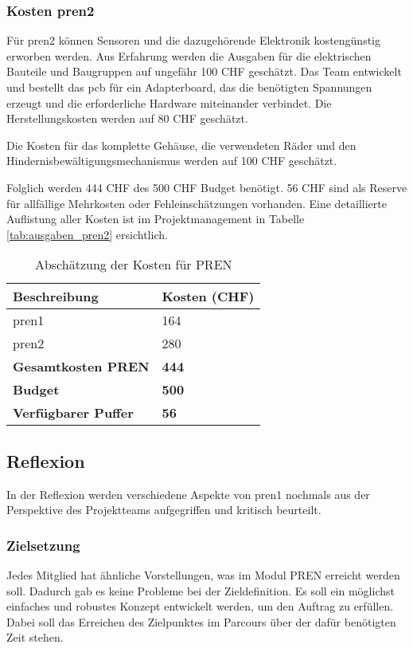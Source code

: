 \documentclass[../main.tex]{subfiles}
\begin{document}
\subsubsection{Kosten \acrshort{pren2}}
Für \acrshort{pren2} können
Sensoren und die dazugehörende Elektronik kostengünstig erworben werden. Aus Erfahrung werden die Ausgaben für die elektrischen Bauteile und Baugruppen auf ungefähr 100 CHF geschätzt. Das Team entwickelt und bestellt das \acrshort{pcb} für ein Adapterboard, das die benötigten Spannungen erzeugt und die erforderliche Hardware miteinander verbindet. Die Herstellungskosten werden auf 80 CHF geschätzt.

Die Kosten für das komplette Gehäuse, die verwendeten Räder und den Hindernisbewältigungsmechanismus werden auf 100 CHF geschätzt.

Folglich werden 444 CHF des 500 CHF Budget benötigt. 56 CHF sind als Reserve für allfällige Mehrkosten oder Fehleinschätzungen vorhanden. Eine detaillierte Auflistung aller Kosten ist im Projektmanagement in Tabelle \ref{tab:ausgaben_pren2} ersichtlich.

\begin{table}[h!]
    \centering
    \begin{tabular}{|p{5cm}|p{3cm}|}
        \hline
        \textbf{Beschreibung} & \textbf{Kosten (CHF)} \\
        \hline
        \acrshort{pren1} & 164 \\
        \hline
        \acrshort{pren2} & 280 \\
        \hline
        \textbf{Gesamtkosten PREN} & \textbf{444} \\
        \hline
        \textbf{Budget} & \textbf{500} \\
        \hline
        \textbf{Verfügbarer Puffer} & \textbf{56} \\
        \hline
    \end{tabular}
    \caption{Abschätzung der Kosten für PREN}
    \label{tab:kostenuebersicht}
\end{table}

\subsection{Reflexion}
In der Reflexion werden verschiedene Aspekte von \acrshort{pren1} nochmals aus der Perspektive des Projektteams aufgegriffen und kritisch beurteilt.

\subsubsection{Zielsetzung}
Jedes Mitglied hat ähnliche Vorstellungen, was im Modul PREN erreicht werden soll. Dadurch gab es keine Probleme bei der Zieldefinition. Es soll ein möglichst einfaches und robustes Konzept entwickelt werden, um den Auftrag zu erfüllen. Dabei soll das Erreichen des Zielpunktes im Parcours über der dafür benötigten Zeit stehen.
\end{document}
